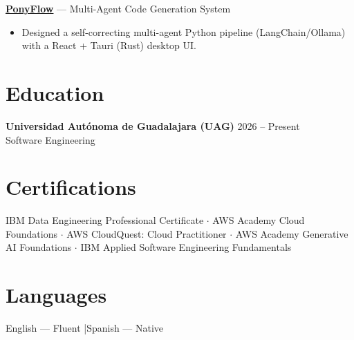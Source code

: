\documentclass[10pt,a4paper]{article}
\begin{document}
\textbf{\href{https://github.com/Emilio-Gordillo-Esparragoza/PonyFlow}{PonyFlow}} --- Multi-Agent Code Generation System\\
\begin{itemize}
    \item Designed a self-correcting multi-agent Python pipeline (LangChain/Ollama) with a React + Tauri (Rust) desktop UI.
\end{itemize}

\section*{Education}
\textbf{Universidad Aut\'onoma de Guadalajara (UAG)} \hfill 2026 -- Present\\
Software Engineering

\section*{Certifications}
IBM Data Engineering Professional Certificate $\cdot$
AWS Academy Cloud Foundations $\cdot$
AWS CloudQuest: Cloud Practitioner $\cdot$
AWS Academy Generative AI Foundations $\cdot$
IBM Applied Software Engineering Fundamentals

\section*{Languages}
English --- Fluent \quad|\quad Spanish --- Native
\end{document}
